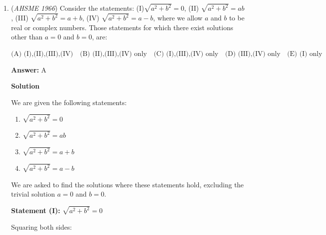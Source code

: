 \begin{enumerate}
 An "$n$-pointed star" is formed as follows: the sides of a convex polygon are numbered consecutively $1,2,\cdots ,k,\cdots,n,\text{ }n\ge 5$; for all $n$ values of $k$, sides $k$ and $k+2$ are non-parallel, sides $n+1$ and $n+2$ being respectively identical with sides $1$ and $2$; prolong the $n$ pairs of sides numbered $k$ and $k+2$ until they meet. (A figure is shown for the case $n=5$).


 Let $S$ be the degree-sum of the interior angles at the $n$ points of the star; then $S$ equals:


 $\text{(A) } 180 \quad \text{(B) } 360 \quad \text{(C) } 180(n+2) \quad \text{(D) } 180(n-2) \quad \text{(E) } 180(n-4)$

 \textbf{Answer: }E



\textbf{Solution}

$\fbox{E}$



	\item (\textit{AHSME 1966}) Consider the statements: (I)$\sqrt{a^2+b^2}=0$,   (II) $\sqrt{a^2+b^2}=ab$,   (III) $\sqrt{a^2+b^2}=a+b$,   (IV) $\sqrt{a^2+b^2}=a - b$, where we allow $a$ and $b$ to be real or complex numbers. Those statements for which there exist solutions other than $a=0$ and $b=0$, are:


 $\text{(A)  (I),(II),(III),(IV)}\quad \text{(B)  (II),(III),(IV) only} \quad \text{(C)  (I),(III),(IV) only}\quad \text{(D)  (III),(IV) only} \quad \text{(E)  (I) only}$

 \textbf{Answer: }A



\textbf{Solution}

We are given the following statements:

 
            \begin{enumerate}
        \item $\sqrt{a^2 + b^2} = 0$
        \item $\sqrt{a^2 + b^2} = ab$
        \item $\sqrt{a^2 + b^2} = a + b$
        \item $\sqrt{a^2 + b^2} = a - b$
            \end{enumerate}
            We are asked to find the solutions where these statements hold, excluding the trivial solution $a = 0$ and $b = 0$.

 \textbf{Statement (I):} $\sqrt{a^2 + b^2} = 0$

 Squaring both sides:


\end{enumerate}
